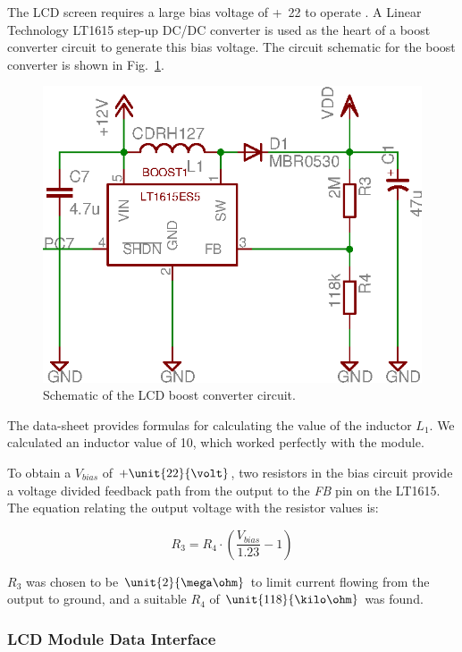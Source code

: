 The LCD screen requires a large bias voltage of \unit{+22}{\volt} to operate \cite{LCD_Module}. A Linear Technology LT1615 step-up DC/DC converter is used as the heart of a boost converter circuit to generate this bias voltage. The circuit schematic for the boost converter is shown in Fig.\ \ref{fig:lcd_boost_converter}.

\begin{figure}[H]
 \centering
 \includegraphics[scale=0.8]{implementation/figures/driver_interface_lcd_bias_circuit.eps}
 \caption{Schematic of the LCD boost converter circuit.}
 \label{fig:lcd_boost_converter}
\end{figure}

The data-sheet provides formulas for calculating the value of the inductor $L_1$. We calculated an inductor value of \unit{10}{\micro\henry}, which worked perfectly with the module.

To obtain a $V_{bias}$ of $+\unit{22}{\volt}$, two resistors in the bias circuit provide a voltage divided feedback path from the output to the \emph{FB} pin on the LT1615. The equation relating the output voltage with the resistor values is:

\begin{equation}
R_{3}=R_{4}\cdot\left(\frac{V_{bias}}{1.23}-1\right)
\end{equation}

 $R_{3}$ was chosen to be $\unit{2}{\mega\ohm}$ to limit current flowing from the output to ground, and a suitable $R_{4}$ of $\unit{118}{\kilo\ohm}$ was found.

\subsubsection{LCD Module Data Interface\label{sec:lcd_module_data_interface}}

